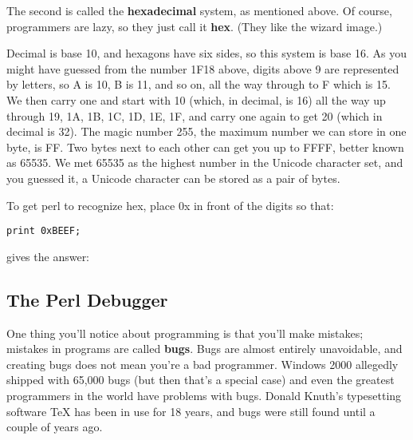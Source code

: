 \documentclass[a4paper,11pt]{book}
\begin{document}
\noindent 


\noindent The second is called the \textbf{hexadecimal }system, as mentioned above. Of course, programmers are lazy, so they just call it \textbf{hex}. (They like the wizard image.)

\noindent 

\noindent 

\noindent Decimal is base 10, and hexagons have six sides, so this system is base 16. As you might have guessed from the number 1F18 above, digits above 9 are represented by letters, so A is 10, B is 11, and so on, all the way through to F which is 15. We then carry one and start with 10 (which, in decimal, is 16) all the way up through 19, 1A, 1B, 1C, 1D, 1E, 1F, and carry one again to get 20 (which in decimal is 32). The magic number 255, the maximum number we can store in one byte, is FF. Two bytes next to each other can get you up to FFFF, better known as 65535. We met 65535 as the highest number in the Unicode character set, and you guessed it, a Unicode character can be stored as a pair of bytes.

\noindent 

\noindent To get perl to recognize hex, place 0x in front of the digits so that:

\noindent 

\noindent \texttt{print 0xBEEF;}

\noindent 

\noindent gives the answer:

\noindent 



\noindent 

\subsection{The Perl Debugger}

\noindent 

\noindent One thing you'll notice about programming is that you'll make mistakes; mistakes in programs are called \textbf{bugs}. Bugs are almost entirely unavoidable, and creating bugs does not mean you're a bad programmer. Windows 2000 allegedly shipped with 65,000 bugs (but then that's a special case) and even the greatest programmers in the world have problems with bugs. Donald Knuth's typesetting software TeX has been in use for 18 years, and bugs were still found until a couple of years ago.

\noindent 
\end{document}
